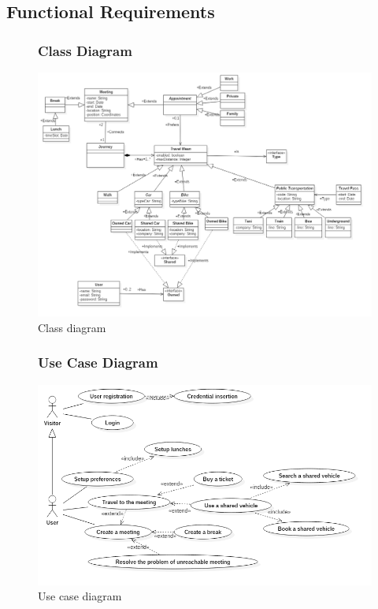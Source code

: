 \subsection{Functional Requirements}


\begin{figure}[!htb]
\subsubsection{Class Diagram}
\centering
\includegraphics[scale=0.4]{images/ClassDiagram}
\caption{Class diagram}
\label{ref:classdiagram}
\end{figure}

\begin{figure}[!htb]
\subsubsection{Use Case Diagram}
\centering
\includegraphics[scale=0.6]{images/UseCaseDiagram}
\caption{Use case diagram}
\label{ref:classdiagram}
\end{figure}
\clearpage

